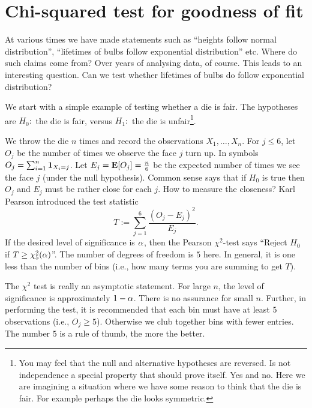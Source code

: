 \documentclass[preprint,  11pt]{amsart}
\begin{document}

%


\section{Chi-squared test for goodness of fit}
At various times we have made statements such as ``heights follow normal distribution'', ``lifetimes of bulbs follow exponential distribution'' etc. Where do such claims come from? Over years of analysing data, of course. This leads to an interesting question. Can we test whether  lifetimes of bulbs do follow exponential distribution?

We start with a simple example of testing whether a die is fair.  The hypotheses are  $H_{0}:$ the die is fair, versus $H_{1}:$ the die is unfair\footnote{You may feel that the null and alternative hypotheses are reversed. Is not independence a special property that should prove itself. Yes and no. Here we are imagining a situation where we have some reason to think that the die is fair. For example perhaps the die looks symmetric.}.

We throw the die $n$ times and record the observations $X_{1},\ldots ,X_{n}$. For $j\le 6$, let $O_{j}$ be the number of times we observe the face $j$ turn up. In symbols $O_{j}=\sum_{i=1}^{n}{\mathbf 1}_{X_{i}=j}$. Let $E_{j}=\mathbf{E}[O_{j}]=\frac{n}{6}$ be the expected number of times we see the face $j$ (under the null hypothesis). Common sense says that if $H_{0}$ is true then $O_{j}$ and $E_{j}$ must be rather close for each $j$. How to measure the closeness? Karl Pearson introduced the test statistic
$$
 T:=\sum_{j=1}^{6}\frac{(O_{j}-E_{j})^{2}}{E_{j}}.
$$
If the desired level of significance is $\alpha$, then the Pearson $\chi^{2}$-test says ``Reject $H_{0}$ if $T\ge \chi^{2}_{5}(\alpha)$''. The number of degrees of freedom is $5$ here. In general, it is one less than the number of bins (i.e., how many terms you are summing to get $T$).

 The $\chi^{2}$ test is really an asymptotic statement. For large $n$, the level of significance is approximately $1-\alpha$. There is no assurance for small $n$. Further, in performing the test, it is recommended that each bin must have at least $5$ observations (i.e., $O_{j}\ge 5$). Otherwise we club together bins with fewer entries. The number $5$ is a rule of thumb, the more the better.
\end{document}

